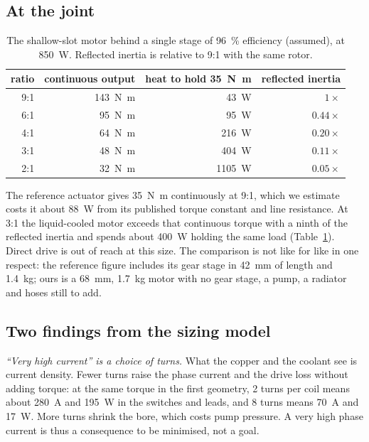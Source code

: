 \documentclass[11pt]{article}
\newcommand{\Nm}{\si{N.m}}
\begin{document}
\subsection{At the joint}

\begin{table}[h]
\centering
\begin{tabular}{rrrr}
\toprule
ratio & continuous output & heat to hold \SI{35}{\Nm} & reflected inertia\\
\midrule
9:1 & \SI{143}{\Nm} & \SI{43}{W} & $1\times$\\
6:1 & \SI{95}{\Nm} & \SI{95}{W} & $0.44\times$\\
4:1 & \SI{64}{\Nm} & \SI{216}{W} & $0.20\times$\\
3:1 & \SI{48}{\Nm} & \SI{404}{W} & $0.11\times$\\
2:1 & \SI{32}{\Nm} & \SI{1105}{W} & $0.05\times$\\
\bottomrule
\end{tabular}
\caption{The shallow-slot motor behind a single stage of \SI{96}{\percent}
efficiency (assumed), at \SI{850}{W}. Reflected inertia is relative to
\num{9}:\num{1} with the same rotor.}
\label{tab:gear}
\end{table}

The reference actuator gives \SI{35}{\Nm} continuously at \num{9}:\num{1},
which we estimate costs it about \SI{88}{W} from its published torque constant
and line resistance. At \num{3}:\num{1} the liquid-cooled motor exceeds that
continuous torque with a ninth of the reflected inertia and spends about
\SI{400}{W} holding the same load (Table~\ref{tab:gear}). Direct drive is out
of reach at this size. The comparison is not like for like in one respect: the
reference figure includes its gear stage in \SI{42}{mm} of length and
\SI{1.4}{kg}; ours is a \SI{68}{mm}, \SI{1.7}{kg} motor with no gear stage, a
pump, a radiator and hoses still to add.

\subsection{Two findings from the sizing model}

\emph{``Very high current'' is a choice of turns.} What the copper and the
coolant see is current density. Fewer turns raise the phase current and the
drive loss without adding torque: at the same torque in the first geometry,
2 turns per coil means about \SI{280}{A} and \SI{195}{W} in the switches and
leads, and 8 turns means \SI{70}{A} and \SI{17}{W}. More turns shrink the
bore, which costs pump pressure. A very high phase current is thus a
consequence to be minimised, not a goal.
\end{document}
